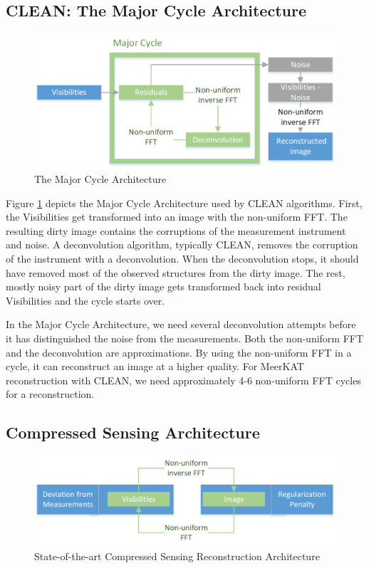 \subsection{CLEAN: The Major Cycle Architecture}

\begin{figure}[h]
	\centering
	\includegraphics[width=0.80\linewidth]{./chapters/02.state/Major-Minor.png}
	\caption{The Major Cycle Architecture}
	\label{hypo:major}
\end{figure}

Figure \ref{hypo:major} depicts the Major Cycle Architecture used by CLEAN algorithms. First, the Visibilities get transformed into an image with the non-uniform FFT. The resulting dirty image contains the corruptions of the measurement instrument and noise. A deconvolution algorithm, typically CLEAN, removes the corruption of the instrument with a deconvolution. When the deconvolution stops, it should have removed most of the observed structures from the dirty image. The rest, mostly noisy part of the dirty image gets transformed back into residual Visibilities and the cycle starts over.

In the Major Cycle Architecture, we need several deconvolution attempts before it has distinguished the noise from the measurements. Both the non-uniform FFT and the deconvolution are approximations. By using the non-uniform FFT in a cycle, it can reconstruct an image at a higher quality. For MeerKAT reconstruction with CLEAN, we need approximately 4-6 non-uniform FFT cycles for a reconstruction.


\subsection{Compressed Sensing Architecture}\label{hypo:CSArch}

\begin{figure}[h]
	\centering
	\includegraphics[width=0.80\linewidth]{./chapters/02.state/CS2.png}
	\caption{State-of-the-art Compressed Sensing Reconstruction Architecture}
	\label{hypo:cs}
\end{figure}

